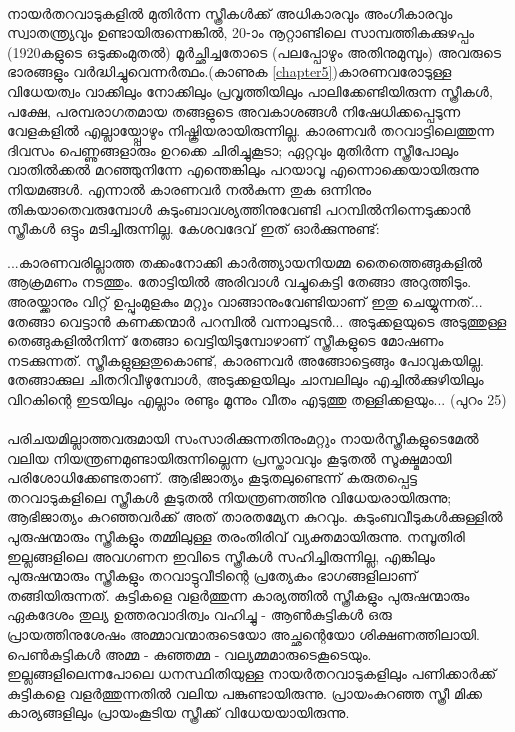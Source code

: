 \paragraph{}നായർതറവാടുകളിൽ മുതിർന്ന സ്ത്രീകൾക്ക് അധികാരവും അംഗീകാരവും സ്വാതന്ത്ര്യവും ഉണ്ടായിരുന്നെങ്കിൽ, 20-ാം നൂറ്റാണ്ടിലെ സാമ്പത്തികക്കുഴപ്പം (1920കളുടെ ഒടുക്കംമുതൽ) മൂർച്ഛിച്ചതോടെ (പലപ്പോഴും അതിനുമുമ്പും) അവരുടെ ഭാരങ്ങളും വർദ്ധിച്ചുവെന്നർത്ഥം.(കാണുക \ref{chapter5})കാരണവരോടുള്ള വിധേയത്വം വാക്കിലും നോക്കിലും പ്രവൃത്തിയിലും പാലിക്കേണ്ടിയിരുന്ന സ്ത്രീകൾ, പക്ഷേ, പരമ്പരാഗതമായ തങ്ങളുടെ അവകാശങ്ങൾ നിഷേധിക്കപ്പെടുന്ന വേളകളിൽ എല്ലായ്പ്പോഴും നിഷ്ക്രിയരായിരുന്നില്ല. കാരണവർ തറവാട്ടിലെത്തുന്ന ദിവസം പെണ്ണുങ്ങളാരും ഉറക്കെ ചിരിച്ചുകൂടാ; ഏറ്റവും മുതിർന്ന സ്ത്രീപോലും വാതിൽക്കൽ മറഞ്ഞുനിന്നേ എന്തെങ്കിലും പറയാവൂ എന്നൊക്കെയായിരുന്നു നിയമങ്ങൾ. എന്നാൽ കാരണവർ നൽകുന്ന തുക ഒന്നിനും തികയാതെവരുമ്പോൾ കുടുംബാവശ്യത്തിനുവേണ്ടി പറമ്പിൽനിന്നെടുക്കാൻ സ്ത്രീകൾ ഒട്ടും മടിച്ചിരുന്നില്ല. കേശവദേവ് ഇത് ഓർക്കുന്നുണ്ട്:
\begin{tcolorbox}{}
...കാരണവരില്ലാത്ത തക്കംനോക്കി കാർത്ത്യായനിയമ്മ തൈത്തെങ്ങുകളിൽ ആക്രമണം നടത്തും. തോട്ടിയിൽ അരിവാൾ വച്ചുകെട്ടി തേങ്ങാ അറുത്തിടും. അരയ്ക്കാനും വിറ്റ് ഉപ്പുംമുളകും മറ്റും വാങ്ങാനുംവേണ്ടിയാണ് ഇതു ചെയ്യുന്നത്... തേങ്ങാ വെട്ടാൻ കണക്കന്മാർ പറമ്പിൽ വന്നാലുടൻ... അടുക്കളയുടെ അടുത്തുള്ള തെങ്ങുകളിൽനിന്ന് തേങ്ങാ വെട്ടിയിടുമ്പോഴാണ് സ്ത്രീകളുടെ മോഷണം നടക്കുന്നത്. സ്ത്രീകളുള്ളതുകൊണ്ട്, കാരണവർ അങ്ങോട്ടെങ്ങും പോവുകയില്ല. തേങ്ങാക്കുല ചിതറിവീഴുമ്പോൾ, അടുക്കളയിലും ചാമ്പലിലും എച്ചിൽക്കുഴിയിലും വിറകിന്റെ ഇടയിലും എല്ലാം രണ്ടും മൂന്നും വീതം എടുത്തു തള്ളിക്കളയും... (പുറം 25)

\end{tcolorbox}

\paragraph{}പരിചയമില്ലാത്തവരുമായി സംസാരിക്കുന്നതിനുംമറ്റും നായർസ്ത്രീകളുടെമേൽ വലിയ നിയന്ത്രണമുണ്ടായിരുന്നില്ലെന്ന പ്രസ്താവവും കൂടുതൽ സൂക്ഷ്മമായി പരിശോധിക്കേണ്ടതാണ്. ആഭിജാത്യം കൂടുതലുണ്ടെന്ന് കരുതപ്പെട്ട തറവാടുകളിലെ സ്ത്രീകൾ കൂടുതൽ നിയന്ത്രണത്തിനു വിധേയരായിരുന്നു; ആഭിജാത്യം കുറഞ്ഞവർക്ക് അത് താരതമ്യേന കുറവും. കുടുംബവീടുകൾക്കുള്ളിൽ പുരുഷന്മാരും സ്ത്രീകളും തമ്മിലുള്ള തരംതിരിവ് വ്യക്തമായിരുന്നു. നമ്പൂതിരി ഇല്ലങ്ങളിലെ അവഗണന ഇവിടെ സ്ത്രീകൾ സഹിച്ചിരുന്നില്ല, എങ്കിലും പുരുഷന്മാരും സ്ത്രീകളും തറവാട്ടുവീടിന്റെ പ്രത്യേകം ഭാഗങ്ങളിലാണ് തങ്ങിയിരുന്നത്. കുട്ടികളെ വളർത്തുന്ന കാര്യത്തിൽ സ്ത്രീകളും പുരുഷന്മാരും ഏകദേശം തുല്യ ഉത്തരവാദിത്വം വഹിച്ചു - ആൺകുട്ടികൾ ഒരു പ്രായത്തിനുശേഷം അമ്മാവന്മാരുടെയോ അച്ഛന്റെയോ ശിക്ഷണത്തിലായി. പെൺകുട്ടികൾ അമ്മ - കുഞ്ഞമ്മ - വല്യമ്മമാരുടെകൂടെയും. ഇല്ലങ്ങളിലെന്നപോലെ ധനസ്ഥിതിയുള്ള നായർതറവാടുകളിലും പണിക്കാർക്ക് കുട്ടികളെ വളർത്തുന്നതിൽ വലിയ പങ്കുണ്ടായിരുന്നു. പ്രായംകുറഞ്ഞ സ്ത്രീ മിക്ക കാര്യങ്ങളിലും പ്രായംകൂടിയ സ്ത്രീക്ക് വിധേയയായിരുന്നു.


